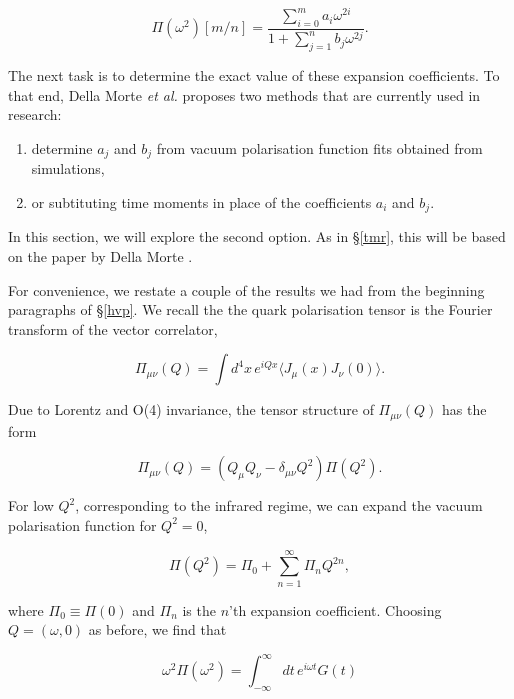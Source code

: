 \documentclass{article}
\numberwithin{equation}{section} %
\begin{document}
\begin{equation}
\Pi(\omega^2)[m/n] = \frac{\sum_{i=0}^ma_i\omega^{2i}}{1+\sum_{j=1}^nb_j\omega^{2j}}.
\end{equation}

The next task is to determine the exact value of these expansion coefficients. To that end, Della Morte \textit{et al.} proposes two methods that are currently used in research:

\begin{enumerate}
\item determine $a_j$ and $b_j$ from vacuum polarisation function fits obtained from simulations,
\item or subtituting time moments in place of the coefficients $a_i$ and $b_j$.
\end{enumerate}

In this section, we will explore the second option. As in \S \ref{tmr}, this will be based on the paper by Della Morte \cite{dellamorte}. 

For convenience, we restate a couple of the results we had from the beginning paragraphs of \S\ref{hvp}. We recall the the quark polarisation tensor is the Fourier transform of the vector correlator,

\begin{equation}
\Pi_{\mu\nu}(Q) = \int d^4x \, e^{iQx} \langle J_\mu(x) J_\nu(0) \rangle.
\end{equation}

\noindent Due to Lorentz and O(4) invariance\cite{vector}, the tensor structure of $\Pi_{\mu\nu}(Q)$ has the form 

\begin{equation}
\Pi_{\mu\nu}(Q) = \left( Q_\mu Q_\nu - \delta_{\mu\nu} Q^2 \right)\Pi(Q^2).
\end{equation}

For low $Q^2$, corresponding to the infrared regime, we can expand the vacuum polarisation function for $Q^2=0$,

\begin{equation}
\Pi(Q^2) = \Pi_0 + \sum_{n=1}^\infty \Pi_n Q^{2n},
\end{equation}

\noindent where $\Pi_0 \equiv \Pi(0)$ and $\Pi_n$ is the $n$'th expansion coefficient. Choosing $Q = (\omega, 0)$ as before, we find that 

\begin{equation}
\omega^2\Pi(\omega^2) = \int^\infty_{-\infty} dt\, e^{i\omega t} G(t)
\end{equation}
\end{document}
